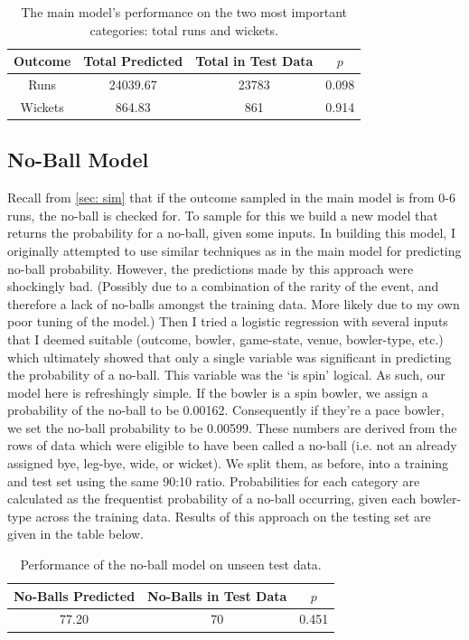 \begin{table}[h]
\vspace{0.5em}
\centering
\begin{tabular} {c c c c} \toprule
    {Outcome} & {Total Predicted} & {Total in Test Data} & {$p$} \\ \midrule
     Runs & 24039.67 & 23783 & 0.098 \\
     Wickets & 864.83 & 861 & 0.914 \\ \bottomrule
\end{tabular}
\caption{The main model's performance on the two most important categories: total runs and wickets.}
\label{table: main model2}
\end{table}

\subsection{No-Ball Model}

Recall from \cref{sec: sim} that if the outcome sampled in the main model is from 0-6 runs, the no-ball is checked for. To sample for this we build a new model that returns the probability for a no-ball, given some inputs. In building this model, I originally attempted to use similar techniques as in the main model for predicting no-ball probability. However, the predictions made by this approach were shockingly bad. (Possibly due to a combination of the rarity of the event, and therefore a lack of no-balls amongst the training data. More likely due to my own poor tuning of the model.) Then I tried a logistic regression with several inputs that I deemed suitable (outcome, bowler, game-state, venue, bowler-type, etc.) which ultimately showed that only a single variable was significant in predicting the probability of a no-ball. This variable was the `is spin' logical. As such, our model here is refreshingly simple. If the bowler is a spin bowler, we assign a probability of the no-ball to be 0.00162. Consequently if they're a pace bowler, we set the no-ball probability to be 0.00599. These numbers are derived from the rows of data which were eligible to have been called a no-ball (i.e. not an already assigned bye, leg-bye, wide, or wicket). We split them, as before, into a training and test set using the same 90:10 ratio. Probabilities for each category are calculated as the frequentist probability of a no-ball occurring, given each bowler-type across the training data. Results of this approach on the testing set are given in the table below.

\begin{table}[h]
\vspace{0.5em}
\centering
\begin{tabular} {c c c} \toprule
    {No-Balls Predicted} & {No-Balls in Test Data} & {$p$} \\ \midrule
     77.20 & 70 & 0.451 \\ \bottomrule
\end{tabular}
\caption{Performance of the no-ball model on unseen test data.}
\label{table: noball}
\end{table}


